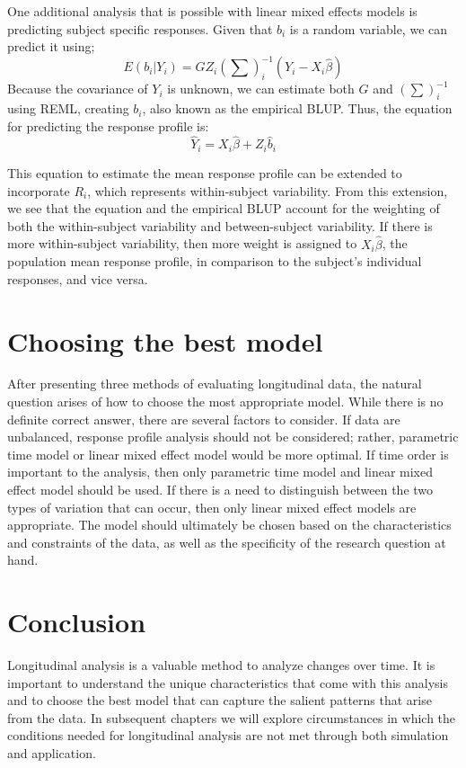 \documentclass[12pt, twoside]{amherstthesis}
\theoremstyle{definition}
\theoremstyle{definition}
\theoremstyle{definition}
\theoremstyle{remark}
\begin{document}
One additional analysis that is possible with linear mixed effects models is predicting subject specific responses. Given that \(b_i\) is a random variable, we can predict it using;
\[E(b_i |Y_i) = GZ_i(\sum)^{-1}_i(Y_i-X_i\hat\beta)\] Because the covariance of \(Y_i\) is unknown, we can estimate both \(G\) and \((\sum)^{-1}_i\) using REML, creating \(b_i\), also known as the empirical BLUP. Thus, the equation for predicting the response profile is:
\[\hat Y_i = X_i\hat\beta +Z_i\hat b_i\]

This equation to estimate the mean response profile can be extended to incorporate \(R_i\), which represents within-subject variability. From this extension, we see that the equation and the empirical BLUP account for the weighting of both the within-subject variability and between-subject variability. If there is more within-subject variability, then more weight is assigned to \(X_i\hat\beta\), the population mean response profile, in comparison to the subject's individual responses, and vice versa.

\hypertarget{choosing-the-best-model}{%
\section{Choosing the best model}\label{choosing-the-best-model}}

After presenting three methods of evaluating longitudinal data, the natural question arises of how to choose the most appropriate model. While there is no definite correct answer, there are several factors to consider. If data are unbalanced, response profile analysis should not be considered; rather, parametric time model or linear mixed effect model would be more optimal. If time order is important to the analysis, then only parametric time model and linear mixed effect model should be used. If there is a need to distinguish between the two types of variation that can occur, then only linear mixed effect models are appropriate. The model should ultimately be chosen based on the characteristics and constraints of the data, as well as the specificity of the research question at hand.

\hypertarget{conclusion}{%
\section{Conclusion}\label{conclusion}}

Longitudinal analysis is a valuable method to analyze changes over time. It is important to understand the unique characteristics that come with this analysis and to choose the best model that can capture the salient patterns that arise from the data. In subsequent chapters we will explore circumstances in which the conditions needed for longitudinal analysis are not met through both simulation and application.
\end{document}
